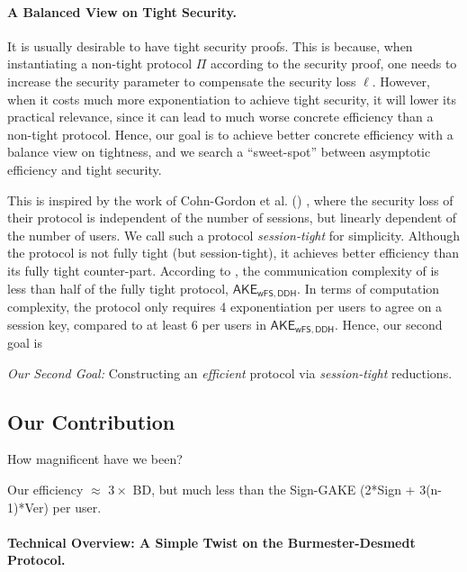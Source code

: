 \paragraph{A Balanced View on Tight Security.}
It is usually desirable to have tight security proofs. 
This is because, when instantiating a non-tight protocol $\Pi$ according to the security proof, one needs to increase the security parameter to compensate the security loss $\ell$.
However, when it costs much more exponentiation to achieve tight security, it will lower its practical relevance, since it can lead to much worse concrete efficiency than a non-tight protocol. Hence, our goal is to achieve better concrete efficiency with a balance view on tightness, and we search a ``sweet-spot'' between asymptotic efficiency and tight security.


This is inspired by the work of Cohn-Gordon et al. (\CCGJJ) \cite{C:CCGJJ19}, where the security loss of their \introAKE protocol is independent of the number of sessions, but linearly dependent of the number of users. We call such a protocol \textit{session-tight} for simplicity. Although the \CCGJJ protocol is not fully tight (but session-tight), it achieves better efficiency than its fully tight counter-part. According to \cite[Fig. 2]{EC:JKRS21}, the communication complexity of \CCGJJ is less than half of the fully tight protocol, $\mathsf{AKE_{wFS,DDH}}$. In terms of computation complexity, the \CCGJJ protocol only requires 4 exponentiation per users to agree on a session key, compared to at least 6 per users in $\mathsf{AKE_{wFS,DDH}}$.
Hence, our second goal is

\begin{displayquote}
	\emph{Our Second Goal:} Constructing an \textit{efficient} \introGAKE protocol via \textit{session-tight} reductions.
\end{displayquote} 


\subsection{Our Contribution}
How magnificent have we been?

Our efficiency $\approx$ $3\times $ BD, but much less than the Sign-GAKE (2*Sign + 3(n-1)*Ver) per user.

\paragraph{Technical Overview: A Simple Twist on the Burmester-Desmedt Protocol.}

